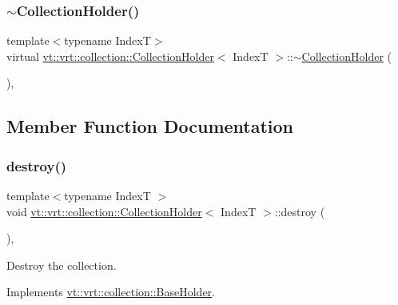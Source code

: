 \subsubsection{\texorpdfstring{$\sim$\+Collection\+Holder()}{~CollectionHolder()}}
{\footnotesize\ttfamily template$<$typename IndexT$>$ \\
virtual \hyperlink{structvt_1_1vrt_1_1collection_1_1_collection_holder}{vt\+::vrt\+::collection\+::\+Collection\+Holder}$<$ IndexT $>$\+::$\sim$\hyperlink{structvt_1_1vrt_1_1collection_1_1_collection_holder}{Collection\+Holder} (\begin{DoxyParamCaption}{ }\end{DoxyParamCaption})\hspace{0.3cm}{\ttfamily [inline]}, {\ttfamily [virtual]}}



\subsection{Member Function Documentation}
\mbox{\label{structvt_1_1vrt_1_1collection_1_1_collection_holder_a00a325a6c9c321d00b6b6eb0fdfbfb9f}} 
\subsubsection{\texorpdfstring{destroy()}{destroy()}}
{\footnotesize\ttfamily template$<$typename IndexT $>$ \\
void \hyperlink{structvt_1_1vrt_1_1collection_1_1_collection_holder}{vt\+::vrt\+::collection\+::\+Collection\+Holder}$<$ IndexT $>$\+::destroy (\begin{DoxyParamCaption}{ }\end{DoxyParamCaption})\hspace{0.3cm}{\ttfamily [override]}, {\ttfamily [virtual]}}



Destroy the collection. 



Implements \hyperlink{structvt_1_1vrt_1_1collection_1_1_base_holder_a56c8289f60121e38f3699bcfafbbd491}{vt\+::vrt\+::collection\+::\+Base\+Holder}.



